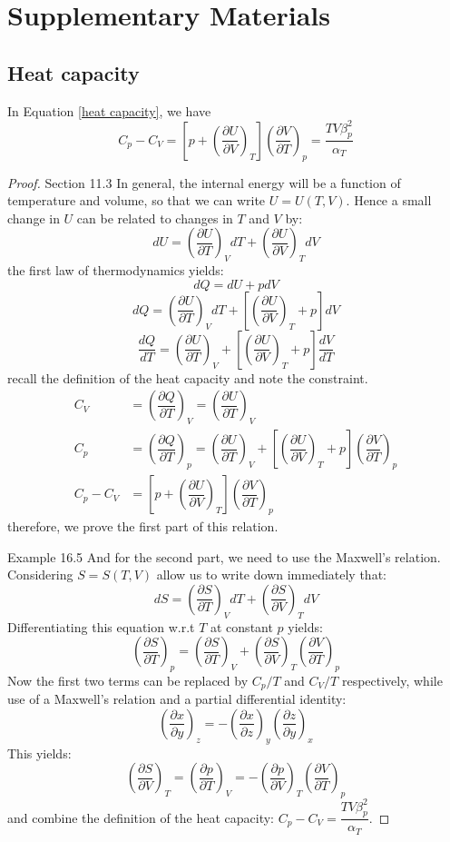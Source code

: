 \documentclass[UTF8]{book}
\begin{document}
\chapter{Supplementary Materials}
\section{Heat capacity}
In Equation \ref{heat capacity}, we have
$$C_p-C_V=\left[p+\left(\dfrac{\partial U}{\partial V}\right)_T\right]\left(\dfrac{\partial V}{\partial T}\right)_p=\dfrac{TV\beta _p^2}{\alpha _T }$$
\begin{proof}
\textsf{Section 11.3 \cite{blundell-concepts}} {In general, the internal energy will be a function of temperature and volume, so that we can write $U=U(T,V)$. Hence a small change in $U$ can be related to changes in $T$ and $V$ by:}
$$dU=\left(\dfrac{\partial U}{\partial T}\right)_VdT+\left(\dfrac{\partial U}{\partial V}\right)_TdV$$
 {the first law of thermodynamics yields:}
$$dQ=dU+pdV$$
$$dQ=\left(\dfrac{\partial U}{\partial T}\right)_VdT+\left[\left(\dfrac{\partial U}{\partial V}\right)_T+p\right]dV$$
$$\dfrac{dQ}{dT}=\left(\dfrac{\partial U}{\partial T}\right)_V+\left[\left(\dfrac{\partial U}{\partial V}\right)_T+p\right]\dfrac{dV}{dT}$$
recall the definition of the heat capacity and note the constraint.
\begin{align*}
C_V&=\left(\dfrac{\partial Q}{\partial T}\right)_V=\left(\dfrac{\partial U}{\partial T}\right)_V\\
C_p&=\left(\dfrac{\partial Q}{\partial T}\right)_p=\left(\dfrac{\partial U}{\partial T}\right)_V+\left[\left(\dfrac{\partial U}{\partial V}\right)_T+p\right]\left(\dfrac{\partial V}{\partial T}\right)_p\\
C_p-C_V&=\left[p+\left(\dfrac{\partial U}{\partial V}\right)_T\right]\left(\dfrac{\partial V}{\partial T}\right)_p
\end{align*}
therefore, we prove the first part of this relation. 
 
\textsf{Example 16.5 \cite{blundell-concepts}}
And for the second part, we need to use the Maxwell's relation. Considering $S=S(T,V)$ allow us to write down immediately that:
$$dS=\left(\dfrac{\partial S}{\partial T}\right)_VdT+\left(\dfrac{\partial S}{\partial V}\right)_TdV$$
Differentiating this equation w.r.t $T$ at constant $p$ yields:
$$\left(\dfrac{\partial S}{\partial T}\right)_p=\left(\dfrac{\partial S}{\partial T}\right)_V+\left(\dfrac{\partial S}{\partial V}\right)_T\left(\dfrac{\partial V}{\partial T}\right)_p$$
Now the first two terms can be replaced by $C_p/T$ and $C_V/T$ respectively, while use of a Maxwell's relation and a partial differential identity:
$$\left(\dfrac{\partial x}{\partial y}\right)_z=-\left(\dfrac{\partial x}{\partial z}\right)_y\left(\dfrac{\partial z}{\partial y}\right)_x$$
This yields:
\[\left(\dfrac{\partial S}{\partial V}\right)_T=\left(\dfrac{\partial p}{\partial T}\right)_V=-\left(\dfrac{\partial p}{\partial V}\right)_T\left(\dfrac{\partial V}{\partial T}\right)_p\]
and combine the definition of the heat capacity: $C_p-C_V=\dfrac{TV\beta _p^2}{\alpha _T }$.
\end{proof}

\nocite{*}



\newpage
{}
\printindex
\end{document}
